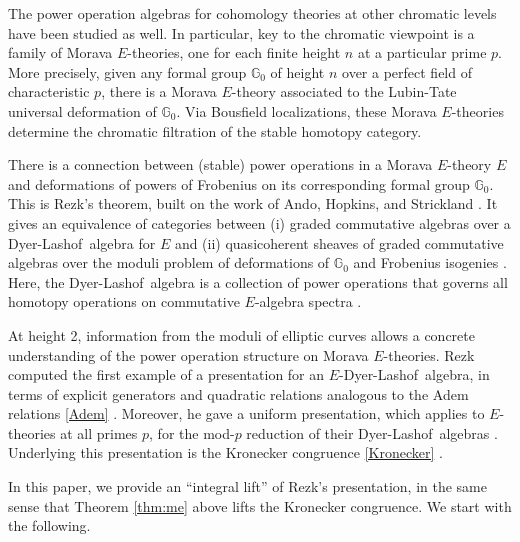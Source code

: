\documentclass{gtpart}
\theoremstyle{definition}
\theoremstyle{remark}
\newcommand{\mb}[1]{\mathbb{#1}}
\newcommand{\DL}{Dyer-Lashof~}
\newcommand{\BG}{{\mb G}}
\renewcommand{\=}{\approx}
\renewcommand{\-}{\sim}
\numberwithin{equation}{section}
\begin{document}
The power operation algebras for cohomology theories at other chromatic levels 
have been studied as well.  In particular, key to the chromatic viewpoint is a 
family of Morava $E$-theories, one for each finite height $n$ at a particular 
prime $p$.  More precisely, given any formal group $\BG_0$ of height $n$ over a 
perfect field of characteristic $p$, there is a Morava $E$-theory associated to 
the Lubin-Tate universal deformation of $\BG_0$.  Via Bousfield localizations, 
these Morava $E$-theories determine the chromatic filtration of the stable 
homotopy category.  

There is a connection between (stable) power operations in a Morava $E$-theory 
$E$ and deformations of powers of Frobenius on its corresponding formal group 
$\BG_0$.  This is Rezk's theorem, built on the work of Ando, Hopkins, and 
Strickland \cite{Ando95, Str97, Str98, AHS04}.  It gives an equivalence of 
categories between (i) graded commutative algebras over a \DL algebra for $E$ 
and (ii) quasicoherent sheaves of graded commutative algebras over the moduli 
problem of deformations of $\BG_0$ and Frobenius isogenies 
\cite[Theorem B]{cong}.  Here, the \DL algebra is a collection of power 
operations that governs all homotopy operations on commutative $E$-algebra 
spectra \cite[Theorem A]{cong}.  

At height 2, information from the moduli of elliptic curves allows a concrete 
understanding of the power operation structure on Morava $E$-theories.  Rezk 
computed the first example of a presentation for an $E$-\DL algebra, in terms of 
explicit generators and quadratic relations analogous to the Adem relations 
\eqref{Adem} \cite{h2p2}.  Moreover, he gave a uniform presentation, which 
applies to $E$-theories at all primes $p$, for the mod-$p$ reduction of their 
\DL algebras \cite[4.8]{mc1}.  Underlying this presentation is the Kronecker 
congruence \eqref{Kronecker} \cite[Proposition 3.15]{mc1}.  

In this paper, we provide an ``integral lift'' of Rezk's presentation, in the 
same sense that Theorem \ref{thm:me} above lifts the Kronecker congruence.  We 
start with the following.  
\end{document}
